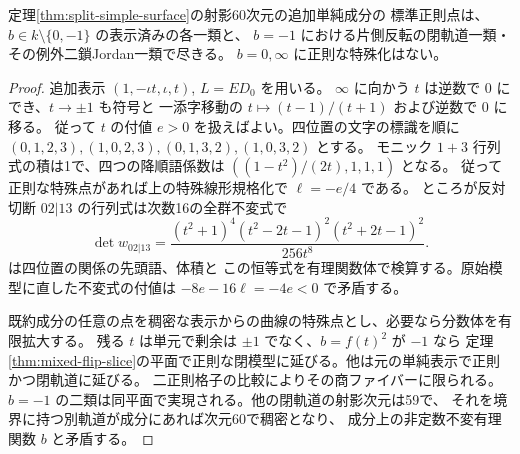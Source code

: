 \begin{theorem}\label{thm:extra-simple-all-regular}
定理\ref{thm:split-simple-surface}の射影60次元の追加単純成分の
標準正則点は、$b\in k\setminus\{0,-1\}$ の表示済みの各一類と、
$b=-1$ における片側反転の閉軌道一類・その例外二鎖Jordan一類で尽きる。
$b=0,\infty$ に正則な特殊化はない。
\end{theorem}
\begin{proof}
追加表示 $(1,-\iota t,\iota,t)$, $L=ED_0$ を用いる。
$\infty$ に向かう $t$ は逆数で $0$ にでき、$t\to\pm1$ も符号と
一添字移動の $t\mapsto(t-1)/(t+1)$ および逆数で $0$ に移る。
従って $t$ の付値 $e>0$ を扱えばよい。四位置の文字の標識を順に
$(0,1,2,3),(1,0,2,3),(0,1,3,2),(1,0,3,2)$ とする。
モニック $1+3$ 行列式の積は1で、四つの降順語係数は $((1-t^2)/(2t),1,1,1)$ となる。
従って正則な特殊点があれば上の特殊線形規格化で $\ell=-e/4$ である。
ところが反対切断 $02|13$ の行列式は次数16の全群不変式で
\[
 \det w_{02|13}=
 \frac{(t^2+1)^4(t^2-2t-1)^2(t^2+2t-1)^2}{256t^8}.
\]
 は四位置の関係の先頭語、体積と
この恒等式を有理関数体で検算する。原始模型に直した不変式の付値は $-8e-16\ell=-4e<0$ で矛盾する。

既約成分の任意の点を稠密な表示からの曲線の特殊点とし、必要なら分数体を有限拡大する。
残る $t$ は単元で剰余は $\pm1$ でなく、$b=f(t)^2$ が $-1$ なら
定理\ref{thm:mixed-flip-slice}の平面で正則な閉模型に延びる。他は元の単純表示で正則かつ閉軌道に延びる。
二正則格子の比較によりその商ファイバーに限られる。
$b=-1$ の二類は同平面で実現される。他の閉軌道の射影次元は59で、
それを境界に持つ別軌道が成分にあれば次元60で稠密となり、
成分上の非定数不変有理関数 $b$ と矛盾する。
\end{proof}
